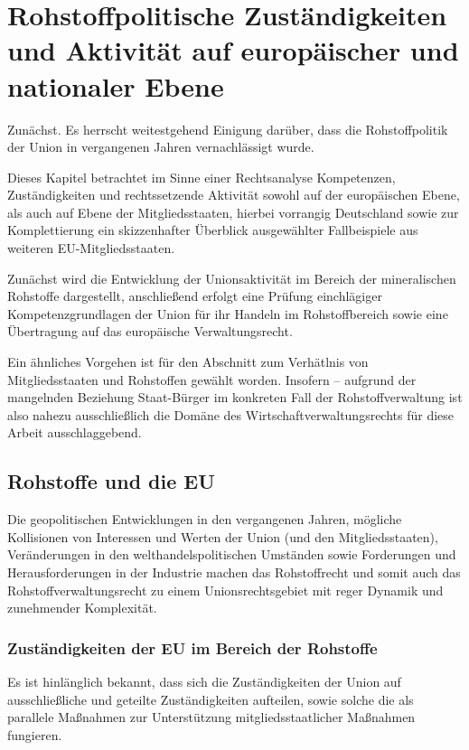 \documentclass[12pt,a4paper,oneside]{book} %
\begin{document}
	
\chapter{Rohstoffpolitische Zuständigkeiten und Aktivität auf europäischer und nationaler Ebene}
Zunächst. Es herrscht weitestgehend Einigung darüber, dass die Rohstoffpolitik der Union in vergangenen Jahren vernachlässigt wurde.\autocite{Quantz, ZfPC 2024, 1}

Dieses Kapitel betrachtet im Sinne einer Rechtsanalyse Kompetenzen, Zuständigkeiten und rechtssetzende Aktivität sowohl auf der europäischen Ebene, als auch auf Ebene der Mitgliedsstaaten, hierbei vorrangig Deutschland sowie zur Komplettierung ein skizzenhafter Überblick ausgewählter Fallbeispiele aus weiteren EU-Mitgliedsstaaten.	

Zunächst wird die Entwicklung der Unionsaktivität im Bereich der mineralischen Rohstoffe dargestellt, anschließend erfolgt eine Prüfung einchlägiger Kompetenzgrundlagen der Union für ihr Handeln im Rohstoffbereich sowie eine Übertragung auf das europäische Verwaltungsrecht.

Ein ähnliches Vorgehen ist für den Abschnitt zum Verhätlnis von Mitgliedsstaaten und Rohstoffen gewählt worden. Insofern -- aufgrund der mangelnden Beziehung Staat-Bürger im konkreten Fall der Rohstoffverwaltung ist also nahezu ausschließlich die Domäne des Wirtschaftverwaltungsrechts für diese Arbeit ausschlaggebend.
	
\section{Rohstoffe und die EU}

Die geopolitischen Entwicklungen in den vergangenen Jahren, mögliche Kollisionen von Interessen und Werten der Union (und den Mitgliedsstaaten), Veränderungen in den welthandelspolitischen Umständen sowie Forderungen und Herausforderungen in der Industrie machen das Rohstoffrecht und somit auch das Rohstoffverwaltungsrecht zu einem Unionsrechtsgebiet mit reger Dynamik und zunehmender Komplexität.
	
\subsection{Zuständigkeiten der EU im Bereich der Rohstoffe}

Es ist hinlänglich bekannt, dass sich die Zuständigkeiten der Union auf ausschließliche und geteilte Zuständigkeiten aufteilen, sowie solche die als parallele Maßnahmen zur Unterstützung mitgliedsstaatlicher Maßnahmen fungieren.\autocite{Groeben, von der/Schwarze/Walter Obwexer, 7. Aufl. 2015, AEUV Art. 2 Rn. 7}
\end{document}
